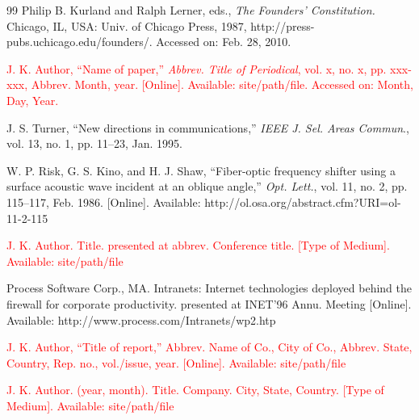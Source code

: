 \documentclass[11pt,a5paper,twoside]{article}
\begin{document}
\begin{thebibliography}{99}
  Philip B. Kurland and Ralph Lerner, eds., \textit{The Founders' Constitution. }Chicago, IL, USA: Univ. of Chicago Press, 1987, http://press-pubs.uchicago.edu/founders/. Accessed on: Feb. 28, 2010. 



  \textcolor{red}{
J. K. Author, ``Name of paper,'' \textit{Abbrev. Title of Periodical}, vol. x, no. x, pp. xxx-xxx, Abbrev. Month, year. [Online]. Available: site/path/file. Accessed on: Month, Day, Year. 
}

  J. S. Turner, ``New directions in communications,'' \textit{IEEE J. Sel. Areas Commun}., vol. 13, no. 1, pp. 11--23, Jan. 1995. 

  W. P. Risk, G. S. Kino, and H. J. Shaw, ``Fiber-optic frequency shifter using a surface acoustic wave incident at an oblique angle,'' \textit{Opt. Lett.}, vol. 11, no. 2, pp. 115--117, Feb. 1986. [Online]. Available: 
http://ol.osa.org/abstract.cfm?URI=ol-11-2-115 



 \textcolor{red}{
 J. K. Author. Title. presented at abbrev. Conference title. [Type of 
Medium]. Available: site/path/file 
}

 Process Software Corp., MA. Intranets: Internet technologies deployed behind the firewall for corporate productivity. presented at INET'96 Annu. Meeting [Online]. Available: http://www.process.com/Intranets/wp2.htp 



 \textcolor{red}{
J. K. Author, ``Title of report,'' Abbrev. Name of Co., City of Co., 
Abbrev. State, Country, Rep. no., vol./issue, year. [Online]. Available: 
site/path/file 
}

 \textcolor{red}{
J. K. Author. (year, month). Title. Company. City, State, Country. [Type of Medium]. Available: site/path/file 
}


\end{thebibliography}
\end{document}
